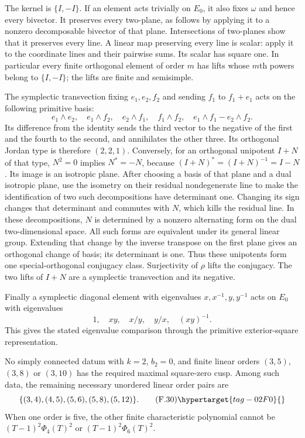 The kernel is $\{I,-I\}$. If an element acts trivially on
$E_0$, it also fixes $\omega$ and hence every bivector.
It preserves every two-plane, as follows by applying it to a
nonzero decomposable bivector of that plane. Intersections of
two-planes show that it preserves every line. A linear map
preserving every line is scalar: apply it to the coordinate lines
and their pairwise sums. Its scalar has square one. In particular
every finite orthogonal element of order $m$ has lifts whose
$m$th powers belong to $\{I,-I\}$; the lifts are finite and
semisimple.

The symplectic transvection fixing $e_1,e_2,f_2$ and sending
$f_1$ to $f_1+e_1$ acts on the following primitive basis:
\[
 e_1\wedge e_2,\quad e_1\wedge f_2,\quad
 e_2\wedge f_1,\quad f_1\wedge f_2,\quad
 e_1\wedge f_1-e_2\wedge f_2.
\]
Its difference from the identity sends the third vector to
the negative of the first and the fourth to the second, and
annihilates the other three. Its orthogonal Jordan type is
therefore $(2,2,1)$. Conversely, for an orthogonal unipotent
$I+N$ of that type, $N^2=0$ implies $N^*=-N$, because
$(I+N)^*=(I+N)^{-1}=I-N$. Its image is an isotropic plane.
After choosing a basis of that plane and a dual isotropic
plane, use the isometry on their residual nondegenerate line
to make the identification of two such decompositions have
determinant one. Changing its sign changes that determinant
and commutes with $N$, which kills the residual line.
In these decompositions, $N$ is determined by a nonzero alternating form on
the dual two-dimensional space. All such forms are equivalent
under its general linear group. Extending that change by the
inverse transpose on the first plane gives an orthogonal
change of basis; its determinant is one. Thus these unipotents
form one special-orthogonal conjugacy class. Surjectivity of
$\rho$ lifts the conjugacy. The two lifts of $I+N$ are a
symplectic transvection and its negative. 

Finally a symplectic diagonal element with eigenvalues
$x,x^{-1},y,y^{-1}$ acts on $E_0$ with eigenvalues
\[
 1,\quad xy,\quad x/y,\quad y/x,\quad (xy)^{-1}.
\]
This gives the stated eigenvalue comparison through the primitive exterior-square representation.

\begin{theorem}\hypertarget{tag-02MZ}{}\label{maps:src:F.2.10}


No simply connected datum with $k=2$, $b_2=0$, and finite linear orders
$(3,5)$, $(3,8)$ or $(3,10)$ has the required maximal
square-zero cusp.  Among such data, the
remaining necessary unordered linear order pairs are
\[
 \{(3,4),(4,5),(5,6),(5,8),(5,12)\}.
 \tag{F.30}\hypertarget{tag-02F0}{}\label{maps:eq:F.30}
\]
When one order is five, the other finite characteristic
polynomial cannot be $(T-1)^2\Phi_4(T)^2$ or
$(T-1)^2\Phi_6(T)^2$.

\end{theorem}


